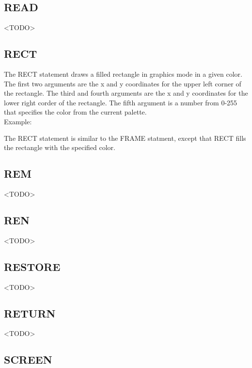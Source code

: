 \subsection{READ}

<TODO>

\subsection{RECT}

The {\ttfamily RECT} statement draws a filled rectangle in graphics mode in a
given color.  The first two arguments are the x and y coordinates for the upper
left corner of the rectangle.  The third and fourth arguments are the x and y
coordinates for the lower right corder of the rectangle.  The fifth argument is
a number from 0-255 that specifies the color from the current palette.\\

Example:\\


The {\ttfamily RECT} statement is similar to the {\ttfamily FRAME} statment,
except that {\ttfamily RECT} fills the rectangle with the specified color.

\subsection{REM}

<TODO>

\subsection{REN}

<TODO>

\subsection{RESTORE}

<TODO>

\subsection{RETURN}

<TODO>

\subsection{SCREEN}

